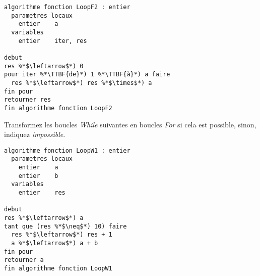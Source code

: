 \documentclass[11pt,a4paper]{article}
\begin{document}

\begin{table}[ht!]
  \centering
  \begin{minipage}{0.5\textwidth}
    \centering
\begin{lstlisting}[style=algorithmique]
algorithme fonction LoopF2 : entier
  parametres locaux
    entier    a
  variables
    entier    iter, res

debut
res %*$\leftarrow$*) 0
pour iter %*\TTBF{de}*) 1 %*\TTBF{à}*) a faire
  res %*$\leftarrow$*) res %*$\times$*) a
fin pour
retourner res
fin algorithme fonction LoopF2 \end{lstlisting}

  \end{minipage}
  \hfillx
  \begin{minipage}{0.5\textwidth}

  \end{minipage}
\end{table}


\clearpage

Transformez les boucles \textit{While} suivantes en boucles \textit{For} si cela est possible, sinon, indiquez \textit{impossible}.


\begin{table}[ht!]
  \centering
  \begin{minipage}{0.5\textwidth}
    \centering
\begin{lstlisting}[style=algorithmique]
algorithme fonction LoopW1 : entier
  parametres locaux
    entier    a
    entier    b
  variables
    entier    res

debut
res %*$\leftarrow$*) a
tant que (res %*$\neq$*) 10) faire
  res %*$\leftarrow$*) res + 1
  a %*$\leftarrow$*) a + b
fin pour
retourner a
fin algorithme fonction LoopW1 \end{lstlisting}

  \end{minipage}
  \hfillx
  \begin{minipage}{0.5\textwidth}

  \end{minipage}
\end{table}

\end{document}
